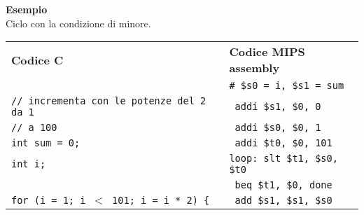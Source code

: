 \documentclass[../main.tex]{subfiles}
\begin{document}
\noindent
\textbf{Esempio} \\
Ciclo con la condizione di minore.
\\[3mm]
\begin{tabular}{ p{9cm} p{9cm} }
    \textbf{Codice C} & \textbf{Codice MIPS assembly} \\
    & \texttt{\# \$s0 = i, \$s1 = sum} \\
    \texttt{// incrementa con le potenze del 2 da 1} & \texttt{ \hspace{0cm} \hspace{0cm} \hspace{0cm} \hspace{0cm} \hspace{0cm} \hspace{0cm} addi \$s1, \$0, 0} \\
    \texttt{// a 100} & \texttt{ \hspace{0cm} \hspace{0cm} \hspace{0cm} \hspace{0cm} \hspace{0cm} \hspace{0cm} addi \$s0, \$0, 1} \\
    \texttt{int sum = 0;} & \texttt{ \hspace{0cm} \hspace{0cm} \hspace{0cm} \hspace{0cm} \hspace{0cm} \hspace{0cm}  addi \$t0, \$0, 101} \\
    \texttt{int i;} & \texttt{loop: slt \$t1, \$s0, \$t0} \\
    & \texttt{ \hspace{0cm} \hspace{0cm} \hspace{0cm} \hspace{0cm} \hspace{0cm} \hspace{0cm} beq \$t1, \$0, done} \\
    \texttt{for (i = 1; i $<$ 101; i = i * 2) \{} & \texttt{ \hspace{0cm} \hspace{0cm} \hspace{0cm} \hspace{0cm} \hspace{0cm} \hspace{0cm} add \$s1, \$s1, \$s0} \\

\end{tabular}
\end{document}
